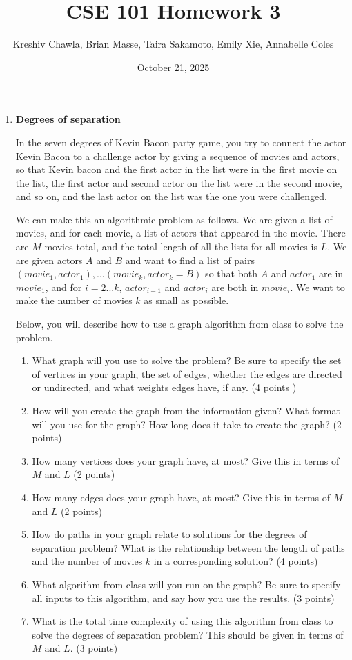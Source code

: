 \documentclass[12pt, letterpaper]{article}
\title{CSE 101 Homework 3}
\author{Kreshiv Chawla, Brian Masse, Taira Sakamoto, Emily Xie, Annabelle Coles}
\date{October 21, 2025}
\begin{document}
\maketitle
\newpage

\begin{enumerate}

\item \textbf{Degrees of separation}

In the seven degrees of Kevin Bacon party game, you try to connect the actor Kevin Bacon to a challenge actor by giving a sequence of movies and actors, so that Kevin bacon and the first actor in the list were in the first movie on the list, the first actor and second actor on the list were in the second movie, and so on, and the last actor on the list was the one you were challenged. 

We can make this an algorithmic problem as follows.
We are given a list of movies, and for each movie, a list of actors that
appeared in the movie.  There are $M$ movies total, and the total length of all the lists for all movies is $L$. We are given actors $A$ and $B$ and want to find a list of pairs $(movie_1,actor_1),...(movie_k,actor_k=B)$ so that
both $A$ and $actor_1$ are in $movie_1$, and for
$i=2...k$, $actor_{i-1}$ and $actor_i$ are
both in $movie_i$.  We want to make the number of movies $k$ as small as possible.  

Below, you will describe how to use a graph algorithm from class to solve the
problem.
\begin{enumerate}
\item  What graph will you use to solve the problem?  Be sure to specify the set of vertices in your graph, the set of edges, whether the edges are directed or undirected, and what weights edges have, if any.  
(4 points )
\item How will you create the graph from the information given?  What format will you use for the graph?  How long does it take to create the graph?
(2 points)
\item How many vertices does your graph have, at most? Give this in terms of $M$ and $L$ 
(2 points)
\item How many edges does your graph have, at most? Give this in terms of $M$ and $L$ 
(2 points)
\item  How do paths in your graph relate to solutions for the degrees of separation problem?  What is the relationship between the length of paths and the number of movies $k$ in a corresponding solution?
(4 points)
\item What algorithm from class will you run on the graph?
Be sure to specify all inputs to this algorithm, and say how you use the results.
(3 points)
\item What is the total time complexity of using this algorithm from class to solve the degrees of separation problem?  This should be given in terms of $M$ and $L$.
(3 points)
\end{enumerate}


\end{enumerate}
\end{document}
